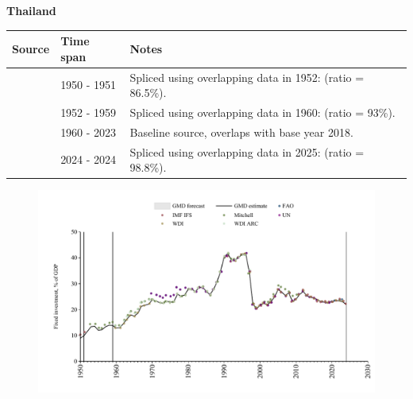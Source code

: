\documentclass[12pt,a4paper,landscape]{article}
\begin{document}
\begin{adjustbox}{max totalsize={\paperwidth}{\paperheight},center}
\begin{minipage}[t][\textheight][t]{\textwidth}
\vspace*{0.5cm}
{}
\begin{center}
{\Large\bfseries Thailand}
\end{center}
\vspace{0.5cm}
\begin{table}[H]
\centering
\small
\begin{tabular}{|l|l|l|}
\hline
\textbf{Source} & \textbf{Time span} & \textbf{Notes} \\
\hline
\rowcolor{white}\cite{IMF_IFS}& 1950 - 1951 &Spliced using overlapping data in 1952: (ratio = 86.5\%).\\
\rowcolor{lightgray}\cite{Mitchell}& 1952 - 1959 &Spliced using overlapping data in 1960: (ratio = 93\%).\\
\rowcolor{white}\cite{WDI}& 1960 - 2023 &Baseline source, overlaps with base year 2018.\\
\rowcolor{lightgray}\cite{IMF_IFS}& 2024 - 2024 &Spliced using overlapping data in 2025: (ratio = 98.8\%).\\
\hline
\end{tabular}
\end{table}
\begin{figure}[H]
\centering
\includegraphics[width=\textwidth,height=0.6\textheight,keepaspectratio]{graphs/THA_finv_GDP.pdf}
\end{figure}
\end{minipage}
\end{adjustbox}
\end{document}
